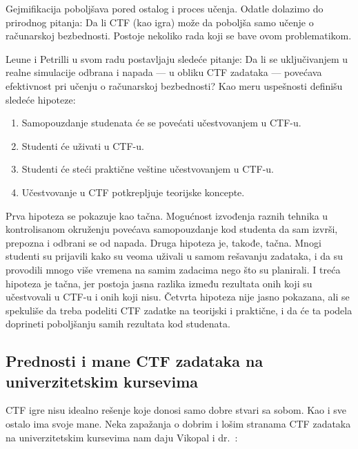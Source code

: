 \documentclass[12pt, a4paper, twocolumn]{article}
\begin{document}
Gejmifikacija poboljšava pored ostalog i proces učenja. \cite{gami1, gami2}
Odatle dolazimo do prirodnog pitanja: Da li CTF (kao igra) može da poboljša
samo učenje o računarskoj bezbednosti. Postoje nekoliko rada koji se bave
ovom problematikom.

Leune i Petrilli \cite{ctf_leune} u svom radu postavljaju sledeće pitanje:
Da li se uključivanjem u realne simulacije odbrana i napada --- u obliku
CTF zadataka --- povećava efektivnost pri učenju o računarskoj bezbednosti?
Kao meru uspešnosti definišu sledeće hipoteze:

\begin{enumerate}
    \item Samopouzdanje studenata će se povećati učestvovanjem u CTF-u.
    \item Studenti će uživati u CTF-u.
    \item Studenti će steći praktične veštine učestvovanjem u CTF-u.
    \item Učestvovanje u CTF potkrepljuje teorijske koncepte.
\end{enumerate}

Prva hipoteza se pokazuje kao tačna. Mogućnost izvođenja raznih tehnika u 
kontrolisanom okruženju povećava samopouzdanje kod studenta da sam izvrši,
prepozna i odbrani se od napada. Druga hipoteza je, takođe, tačna. Mnogi
studenti su prijavili kako su veoma uživali u samom rešavanju zadataka, i
da su provodili mnogo više vremena na samim zadacima nego što su planirali.
I treća hipoteza je tačna, jer postoja jasna razlika između rezultata
onih koji su učestvovali u CTF-u i onih koji nisu. Četvrta hipoteza nije jasno
pokazana, ali se spekuliše da treba podeliti CTF zadatke na teorijski i
praktične, i da će ta podela doprineti poboljšanju samih rezultata kod
studenata.

\subsection{Prednosti i mane CTF zadataka na univerzitetskim kursevima}

CTF igre nisu idealno rešenje koje donosi samo dobre stvari sa sobom.
Kao i sve ostalo ima svoje mane. Neka zapažanja o dobrim i lošim stranama 
CTF zadataka na univerzitetskim kursevima nam daju Vikopal i dr.\ 
\cite{ctf_uni}:
\end{document}

